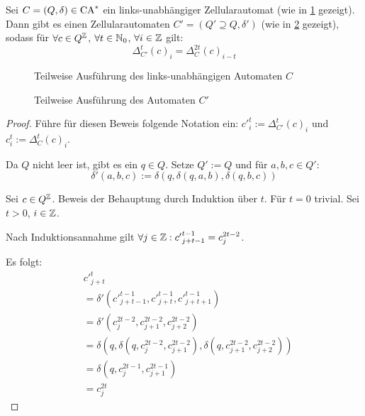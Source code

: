 \begin{satz}
    \label{linksunabhaengigZuZellauto}
    Sei $C = (Q, \delta) \in \textrm{CA}^*$ ein links-unabhängiger Zellularautomat (wie in \cref{fig:LinksunabhZuNormal1} gezeigt).
    Dann gibt es einen Zellularautomaten $C' = (Q' \supseteq Q, \delta')$ (wie in \cref{fig:LinksunabhZuNormal2} gezeigt),
    sodass für $\forall c \in Q^{\mathbb{Z}}$, $\forall t \in \mathbb{N}_0$, $\forall i \in \mathbb{Z}$ gilt:
    \[
        \Delta^t_{C'}(c)_{i} = \Delta^{2t}_C(c)_{i-t}
    \]
    
    \begin{figure}[h!]
        \centering
        
        \caption{Teilweise Ausführung des links-unabhängigen Automaten $C$}
        \label{fig:LinksunabhZuNormal1}
    \end{figure}
   \begin{figure}[h!]
        \centering
        
        \caption{Teilweise Ausführung des Automaten $C'$}
        \label{fig:LinksunabhZuNormal2}
    \end{figure}

\end{satz}
\begin{proof}
    Führe für diesen Beweis folgende Notation ein: ${c'}^{t}_i := \Delta^{t}_{C'}(c)_i$ und $c^t_i := \Delta^{t}_{C}(c)_i$.
    
    Da $Q$ nicht leer ist, gibt es ein $q \in Q$.
    Setze $Q' := Q$ und für $a, b, c \in Q'$:
    \[
        \delta'(a, b, c) := \delta(q, \delta(q, a, b), \delta(q, b, c))
    \]
    
    Sei $c \in Q^{\mathbb{Z}}$. Beweis der Behauptung durch Induktion über $t$. Für $t = 0$ trivial. Sei $t > 0$, $i \in \mathbb{Z}$.

    Nach Induktionsannahme gilt $\forall j \in \mathbb{Z}: {c'}^{t-1}_{j+t-1} = c^{2t-2}_j$.
    
    Es folgt:
    \begin{align*}
        & {c'}^{t}_{j+t} \\
        &= \delta'({c'}^{t-1}_{j+t-1}, {c'}^{t-1}_{j+t}, {c'}^{t-1}_{j+t+1}) \\
        &= \delta'(c^{2t-2}_{j}, c^{2t-2}_{j+1}, c^{2t-2}_{j+2}) \\
        &= \delta(q, \delta(q, c^{2t-2}_{j}, c^{2t-2}_{j+1}), \delta(q, c^{2t-2}_{j+1}, c^{2t-2}_{j+2})) \\
        &= \delta(q, c^{2t-1}_j, c^{2t-1}_{j+1} ) \\
        &= c^{2t}_j 
    \end{align*}
\end{proof}

